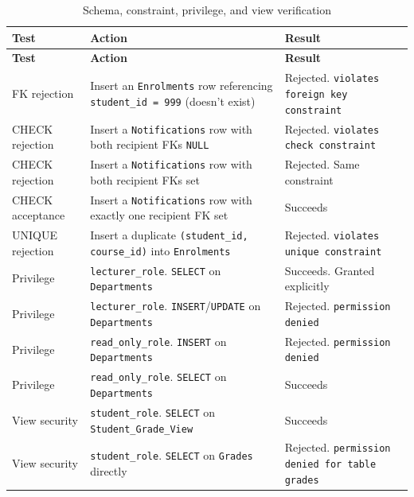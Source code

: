 \documentclass[12pt,a4paper]{article}
\begin{document}
\footnotesize
\renewcommand{\arraystretch}{1.3}
\begin{longtable}{@{} >{\raggedright\arraybackslash}p{3.2cm} >{\raggedright\arraybackslash}p{6.3cm} >{\raggedright\arraybackslash}p{5.5cm} @{}}
\caption{Schema, constraint, privilege, and view verification}\\
\toprule
\textbf{Test} & \textbf{Action} & \textbf{Result} \\
\midrule
\endfirsthead

\toprule
\textbf{Test} & \textbf{Action} & \textbf{Result} \\
\midrule
\endhead

\bottomrule
\endfoot

FK rejection & Insert an \lstinline|Enrolments| row referencing \lstinline|student_id = 999| (doesn't exist) & Rejected. \lstinline|violates foreign key constraint| \\[0.4em]
CHECK rejection & Insert a \lstinline|Notifications| row with both recipient FKs \lstinline|NULL| & Rejected. \lstinline|violates check constraint| \\[0.4em]
CHECK rejection & Insert a \lstinline|Notifications| row with both recipient FKs set & Rejected. Same constraint \\[0.4em]
CHECK acceptance & Insert a \lstinline|Notifications| row with exactly one recipient FK set & Succeeds \\[0.4em]
UNIQUE rejection & Insert a duplicate \lstinline|(student_id, course_id)| into \lstinline|Enrolments| & Rejected. \lstinline|violates unique constraint| \\[0.4em]
Privilege & \lstinline|lecturer_role|. \lstinline|SELECT| on \lstinline|Departments| & Succeeds. Granted explicitly \\[0.4em]
Privilege & \lstinline|lecturer_role|. \lstinline|INSERT|/\lstinline|UPDATE| on \lstinline|Departments| & Rejected. \lstinline|permission denied| \\[0.4em]
Privilege & \lstinline|read_only_role|. \lstinline|INSERT| on \lstinline|Departments| & Rejected. \lstinline|permission denied| \\[0.4em]
Privilege & \lstinline|read_only_role|. \lstinline|SELECT| on \lstinline|Departments| & Succeeds \\[0.4em]
View security & \lstinline|student_role|. \lstinline|SELECT| on \lstinline|Student_Grade_View| & Succeeds \\[0.4em]
View security & \lstinline|student_role|. \lstinline|SELECT| on \lstinline|Grades| directly & Rejected. \lstinline|permission denied for table grades| \\

\end{longtable}
\renewcommand{\arraystretch}{1.0}
\normalsize
\end{document}
